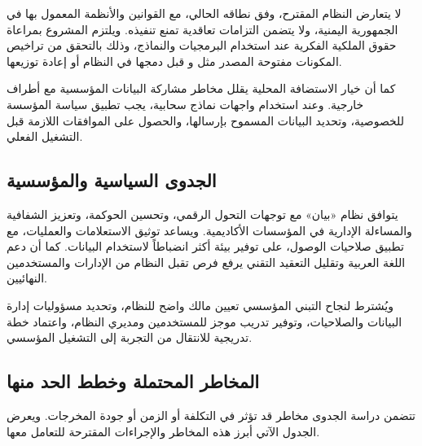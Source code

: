 لا يتعارض النظام المقترح، وفق نطاقه الحالي، مع القوانين والأنظمة المعمول بها في الجمهورية اليمنية، ولا يتضمن التزامات تعاقدية تمنع تنفيذه. ويلتزم المشروع بمراعاة حقوق الملكية الفكرية عند استخدام البرمجيات والنماذج، وذلك بالتحقق من تراخيص المكونات مفتوحة المصدر مثل  و قبل دمجها في النظام أو إعادة توزيعها.

كما أن خيار الاستضافة المحلية  يقلل مخاطر مشاركة البيانات المؤسسية مع أطراف خارجية. وعند استخدام واجهات نماذج سحابية، يجب تطبيق سياسة المؤسسة للخصوصية، وتحديد البيانات المسموح بإرسالها، والحصول على الموافقات اللازمة قبل التشغيل الفعلي.

\subsection{الجدوى السياسية والمؤسسية}
\label{subsec:institutional-feasibility}

يتوافق نظام «بيان» مع توجهات التحول الرقمي، وتحسين الحوكمة، وتعزيز الشفافية والمساءلة الإدارية في المؤسسات الأكاديمية. ويساعد توثيق الاستعلامات والعمليات، مع تطبيق صلاحيات الوصول، على توفير بيئة أكثر انضباطاً لاستخدام البيانات. كما أن دعم اللغة العربية وتقليل التعقيد التقني يرفع فرص تقبل النظام من الإدارات والمستخدمين النهائيين.

ويُشترط لنجاح التبني المؤسسي تعيين مالك واضح للنظام، وتحديد مسؤوليات إدارة البيانات والصلاحيات، وتوفير تدريب موجز للمستخدمين ومديري النظام، واعتماد خطة تدريجية للانتقال من التجربة إلى التشغيل المؤسسي.

\subsection{المخاطر المحتملة وخطط الحد منها}
\label{subsec:feasibility-risks}

تتضمن دراسة الجدوى مخاطر قد تؤثر في التكلفة أو الزمن أو جودة المخرجات. ويعرض الجدول الآتي أبرز هذه المخاطر والإجراءات المقترحة للتعامل معها.

